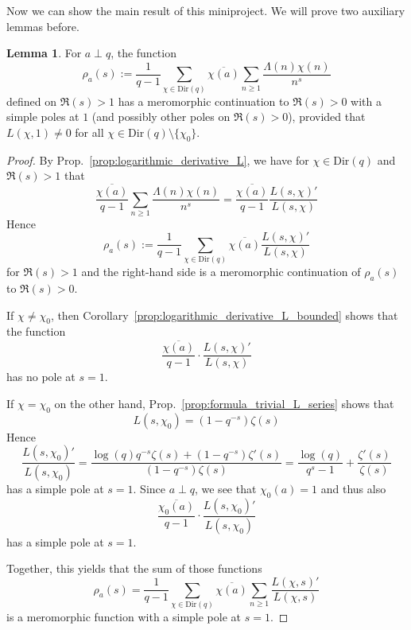 \documentclass{scrartcl}
\theoremstyle{definition}
\newtheorem{lemma}[definition]{Lemma}
\begin{document}
Now we can show the main result of this miniproject.
We will prove two auxiliary lemmas before.
\begin{lemma}
    \label{prop:rho_pole_at_one}
    For $a \perp q$, the function
    \begin{equation*}
        \rho_a(s) := \frac 1 {q - 1} \sum_{\chi \in \mathrm{Dir}(q)} \overline{\chi(a)} \sum_{n \geq 1} \frac {\Lambda(n) \chi(n)} {n^s}
    \end{equation*}
    defined on $\Re(s) > 1$ has a meromorphic continuation to $\Re(s) > 0$ with a simple poles at $1$ (and possibly other poles on $\Re(s) > 0$), provided that $L(\chi, 1) \neq 0$ for all $\chi \in \mathrm{Dir}(q) \setminus \{ \chi_0 \}$.
\end{lemma}
\begin{proof}
    By Prop.~\ref{prop:logarithmic_derivative_L}, we have for $\chi \in \mathrm{Dir}(q)$ and $\Re(s) > 1$ that
    \begin{equation*}
        \frac {\overline{\chi(a)}} {q - 1} \sum_{n \geq 1} \frac {\Lambda(n) \chi(n)} {n^s} = \frac {\overline{\chi(a)}} {q - 1} \frac {L(s, \chi)'} {L(s, \chi)}
    \end{equation*}
    Hence
    \begin{equation*}
        \rho_a(s) := \frac 1 {q - 1} \sum_{\chi \in \mathrm{Dir}(q)} \overline{\chi(a)} \frac {L(s, \chi)'} {L(s, \chi)}
    \end{equation*}
    for $\Re(s) > 1$ and the right-hand side is a meromorphic continuation of $\rho_a(s)$ to $\Re(s) > 0$.

    If $\chi \neq \chi_0$, then Corollary~\ref{prop:logarithmic_derivative_L_bounded} shows that the function
    \begin{equation*}
        \frac {\overline{\chi(a)}} {q - 1} \cdot \frac {L(s, \chi)'} {L(s, \chi)}
    \end{equation*}
    has no pole at $s = 1$.
    
    If $\chi = \chi_0$ on the other hand, Prop.~\ref{prop:formula_trivial_L_series} shows that
    \begin{equation*}
        L(s, \chi_0) = (1 - q^{-s}) \zeta(s)
    \end{equation*}
    Hence
    \begin{equation*}
        \frac {L(s, \chi_0)'} {L(s, \chi_0)} = \frac { \log(q)q^{-s} \zeta(s) + (1 - q^{-s}) \zeta'(s) } { (1 - q^{-s})\zeta(s) } = \frac {\log(q)} {q^s - 1} + \frac {\zeta'(s)} {\zeta(s)}
    \end{equation*}
    has a simple pole at $s = 1$.
    Since $a \perp q$, we see that $\chi_0(a) = 1$ and thus also
    \begin{equation*}
        \frac {\overline{\chi_0(a)}} {q - 1} \cdot \frac {L(s, \chi_0)'} {L(s, \chi_0)}
    \end{equation*}
    has a simple pole at $s = 1$.

    Together, this yields that the sum of those functions
    \begin{equation*}
        \rho_a(s) = \frac 1 {q - 1} \sum_{\chi \in \mathrm{Dir}(q)} \overline{\chi(a)} \sum_{n \geq 1} \frac {L(\chi, s)'} {L(\chi, s)}
    \end{equation*}
    is a meromorphic function with a simple pole at $s = 1$.
\end{proof}
\end{document}
